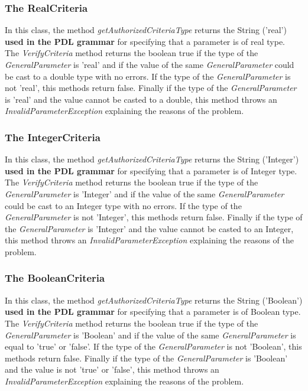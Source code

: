 \documentclass[a4paper,11pt] {ivoa}
\begin{document}
\subsubsection{The RealCriteria}
In this class, the method {\it getAuthorizedCriteriaType} returns the String ('real') {\bf used in the PDL grammar} for specifying that a parameter is of real type.\\
The {\it VerifyCriteria} method returns the boolean true if the type of the {\it GeneralParameter} is 'real' and if the value of the same  {\it GeneralParameter} could be cast to a double type with no errors. If the type of the  {\it GeneralParameter} is not 'real', this methods return false. Finally if the type of the {\it GeneralParameter} is 'real' and the value cannot be casted to a double, this method throws an {\it InvalidParameterException} explaining the reasons of the problem.

\subsubsection{The IntegerCriteria}
In this class, the method {\it getAuthorizedCriteriaType} returns the String ('Integer') {\bf used in the PDL grammar} for specifying that a parameter is of Integer type.\\
The {\it VerifyCriteria} method returns the boolean true if the type of the {\it GeneralParameter} is 'Integer' and if the value of the same  {\it GeneralParameter} could be cast to an Integer type with no errors. If the type of the  {\it GeneralParameter} is not 'Integer', this methods return false. Finally if the type of the {\it GeneralParameter} is 'Integer' and the value cannot be casted to an Integer, this method throws an {\it InvalidParameterException} explaining the reasons of the problem.

\subsubsection{The BooleanCriteria}
In this class, the method {\it getAuthorizedCriteriaType} returns the String ('Boolean') {\bf used in the PDL grammar} for specifying that a parameter is of Boolean type.\\
The {\it VerifyCriteria} method returns the boolean true if the type of the {\it GeneralParameter} is 'Boolean' and if the value of the same  {\it GeneralParameter} is equal to 'true' or 'false'. If the type of the  {\it GeneralParameter} is not 'Boolean', this methods return false. Finally if the type of the {\it GeneralParameter} is 'Boolean' and the value is not 'true' or 'false', this method throws an {\it InvalidParameterException} explaining the reasons of the problem.
\end{document}
